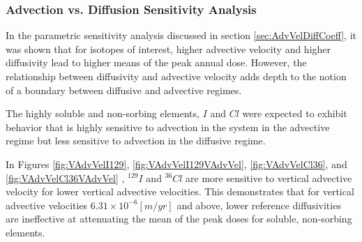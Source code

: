 \subsubsection{Advection vs. Diffusion Sensitivity Analysis}

In the parametric sensitivity analysis discussed in section
\ref{sec:AdvVelDiffCoeff}, it was shown that for isotopes of interest, higher
advective velocity and higher diffusivity lead to higher means of the peak
annual dose. However, the relationship between diffusivity and advective
velocity adds depth to the notion of a boundary between diffusive and advective
regimes.

The highly soluble and non-sorbing elements, $I$ and $Cl$ 
were expected to exhibit behavior that is highly sensitive 
to advection in the system in the advective regime but less sensitive to 
advection in the diffusive regime.  

In Figures \ref{fig:VAdvVelI129}, \ref{fig:VAdvVelI129VAdvVel}, 
\ref{fig:VAdvVelCl36}, and \ref{fig:VAdvVelCl36VAdvVel} , $^{129}I$ and 
$^{36}Cl$ are more sensitive to vertical advective velocity for lower vertical 
advective velocities. This demonstrates that for vertical advective velocities 
$6.31\times10^{-6}[m/yr]$ and above, lower reference diffusivities are 
ineffective at attenuating the mean of the peak doses for soluble, non-sorbing 
elements. 

